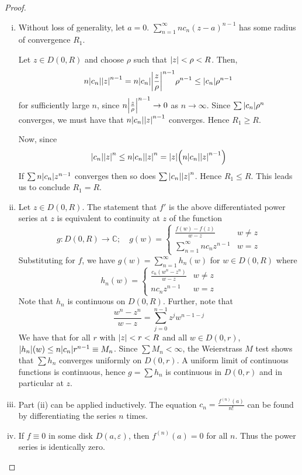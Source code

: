 \begin{proof}
	\begin{enumerate}[(i)]
		\item Without loss of generality, let \( a = 0 \).
			\( \sum_{n=1}^\infty nc_n(z-a)^{n-1} \) has some radius of convergence \( R_1 \).

			Let \( z \in D(0,R) \) and choose \( \rho \) such that \( \abs{z} < \rho < R \).
			Then,
			\[ n \abs{c_n}\abs{z}^{n-1} = n \abs{c_n} \abs{\frac{z}{\rho}}^{n-1} \rho^{n-1} \leq \abs{c_n} \rho^{n-1} \]
			for sufficiently large \( n \), since \( n \abs{\frac{z}{\rho}}^{n-1} \to 0 \) as \( n \to \infty \).
			Since \( \sum \abs{c_n} \rho^n \) converges, we must have that \( n \abs{c_n}\abs{z}^{n-1} \) converges.
			Hence \( R_1 \geq R \).

			Now, since
			\[ \abs{c_n}\abs{z}^n \leq n \abs{c_n}\abs{z}^n = \abs{z}\qty(n \abs{c_n}\abs{z}^{n-1}) \]
			If \( \sum n\abs{c_n}{z}^{n-1} \) converges then so does \( \sum \abs{c_n}\abs{z}^n \).
			Hence \( R_1 \leq R \).
			This leads us to conclude \( R_1 = R \).
		\item Let \( z \in D(0,R) \).
			The statement that \( f' \) is the above differentiated power series at \( z \) is equivalent to continuity at \( z \) of the function
			\[ g \colon D(0,R) \to \mathbb C;\quad g(w) = \begin{cases}
				\frac{f(w) - f(z)}{w - z} & w \neq z \\
				\sum_{n=1}^\infty n c_n z^{n-1} & w = z
			\end{cases} \]
			Substituting for \( f \), we have \( g(w) = \sum_{n=1}^\infty h_n(w) \) for \( w \in D(0,R) \) where
			\[ h_n(w) = \begin{cases}
				\frac{c_n(w^n - z^n)}{w - z} & w \neq z \\
				n c_n z^{n-1} & w = z
			\end{cases} \]
			Note that \( h_n \) is continuous on \( D(0,R) \).
			Further, note that
			\[ \frac{w^n - z^n}{w - z} = \sum_{j=0}^{n-1} z^j w^{n-1-j} \]
			We have that for all \( r \) with \( \abs{z} < r < R \) and all \( w \in D(0,r) \), \( \abs{h_n}(w) \leq n \abs{c_n} r^{n-1} \equiv M_n \).
			Since \( \sum M_n < \infty \), the Weierstrass \( M \) test shows that \( \sum h_n \) converges uniformly on \( D(0,r) \).
			A uniform limit of continuous functions is continuous, hence \( g = \sum h_n \) is continuous in \( D(0,r) \) and in particular at \( z \).
		\item Part (ii) can be applied inductively.
			The equation \( c_n = \frac{f^{(n)}(a)}{n!} \) can be found by differentiating the series \( n \) times.
		\item If \( f \equiv 0 \) in some disk \( D(a, \varepsilon) \), then \( f^{(n)}(a) = 0 \) for all \( n \).
			Thus the power series is identically zero.
	\end{enumerate}
\end{proof}

